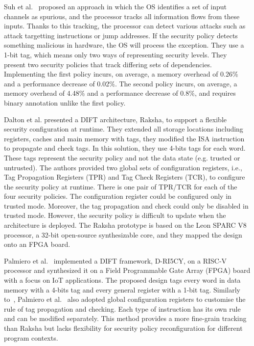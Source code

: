 Suh et al.~\cite{SLD-04-sigplan} proposed an approach in which the OS identifies a set of input channels as spurious, and the processor tracks all information flows from these inputs. Thanks to this tracking, the processor can detect various attacks such as attack targetting instructions or jump addresses. If the security policy detects something malicious in hardware, the OS will process the exception. They use a 1-bit tag, which means only two ways of representing security levels. They present two security policies that track differing sets of dependencies. Implementing the first policy incurs, on average, a memory overhead of 0.26\% and a performance decrease of 0.02\%. The second policy incurs, on average, a memory overhead of 4.48\% and a performance decrease of 0.8\%, and requires binary annotation unlike the first policy.

Dalton et al.\cite{DKK-07-sigarch} presented a DIFT architecture, Raksha, to support a flexible security configuration at runtime. They extended all storage locations including registers, caches and main memory with tags, they modified the ISA instruction to propagate and check tags. In this solution, they use 4-bits tags for each word. These tags represent the security policy and not the data state (e.g. trusted or untrusted). The authors provided two global sets of configuration registers, i.e., Tag Propagation Registers (TPR) and Tag Check Registers (TCR), to configure the security policy at runtime. There is one pair of TPR/TCR for each of the four security policies. The configuration register could be configured only in trusted mode. Moreover, the tag propagation and check could only be disabled in trusted mode. However, the security policy is difficult to update when the architecture is deployed.
The Raksha prototype is based on the Leon SPARC V8 processor, a 32-bit open-source synthesizable core, and they mapped the design onto an FPGA board.

Palmiero et al.~\cite{PDGLC-18-hpec} implemented a DIFT framework, D-RI5CY, on a RISC-V processor and synthesized it on a Field Programmable Gate Array (FPGA) board with a focus on IoT applications. The proposed design tags every word in data memory with a 4-bits tag and every general register with a 1-bit tag. Similarly to~\cite{DKK-07-sigarch}, Palmiero et al.~\cite{PDGLC-18-hpec} also adopted global configuration registers to customise the rule of tag propagation and checking. Each type of instruction has its own rule and can be modified separately. This method provides a more fine-grain tracking than Raksha but lacks flexibility for security policy reconfiguration for different program contexts.

